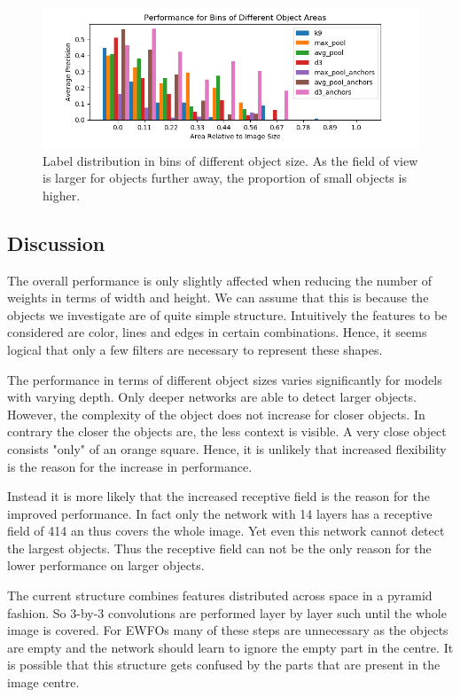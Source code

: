 \begin{figure}[hbtp]
	\centering
	\includegraphics[width=\textwidth]{fig/rf_ap_size}
	\caption{Label distribution in bins of different object size. As the field of view is larger for objects further away, the proportion of small objects is higher.}
	\label{fig:size_bins}
\end{figure}

\subsection{Discussion}

The overall performance is only slightly affected when reducing the number of weights in terms of width and height. We can assume that this is because the objects we investigate are of quite simple structure. Intuitively the features to be considered are color, lines and edges in certain combinations. Hence, it seems logical that only a few filters are necessary to represent these shapes.

The performance in terms of different object sizes varies significantly for models with varying depth. Only deeper networks are able to detect larger objects. However, the complexity of the object does not increase for closer objects. In contrary the closer the objects are, the less context is visible. A very close object consists "only" of an orange square. Hence, it is unlikely that increased flexibility is the reason for the increase in performance. 

Instead it is more likely that the increased receptive field is the reason for the improved performance. In fact only the network with 14 layers has a receptive field of 414 an thus covers the whole image. Yet even this network cannot detect the largest objects. Thus the receptive field can not be the only reason for the lower performance on larger objects.

The current structure combines features distributed across space in a pyramid fashion. So 3-by-3 convolutions are performed layer by layer such until the whole image is covered. For \acp{EWFO} many of these steps are unnecessary as the objects are empty and the network should learn to ignore the empty part in the centre. It is possible that this structure gets confused by the parts that are present in the image centre.

